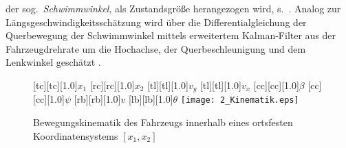 der sog.\ \emph{Schwimmwinkel}, als Zustandsgröße herangezogen wird, s.\ . Analog zur Längsgeschwindigkeitsschätzung wird über die Differentialgleichung der Querbewegung der Schwimmwinkel mittels erweitertem Kalman-Filter aus der Fahrzeugdrehrate um die Hochachse, der Querbeschleunigung und dem Lenkwinkel geschätzt \cite{tno2007_stateestimator, BHB2012_vanZanten_bremsanlage, Konig2008}.
\begin{figure}[h]
\centering
\newcommand{\smallsize}{.85}
	[tc][tc][1.0]{$x_1$}
	[rc][rc][1.0]{$x_2$}
	[tl][tl][1.0]{$v_y$}
	[tl][tl][1.0]{$v_x$}
	[cc][cc][1.0]{$\beta$}
	[cc][cc][1.0]{$\psi$}
	[rb][rb][1.0]{$v$}
	[lb][lb][1.0]{$\theta$}
\texttt{[image: 2\_Kinematik.eps]}
 \caption[Bewegungskinematik des Fahrzeugs]{Bewegungskinematik des Fahrzeugs innerhalb eines ortsfesten Koordinatensystems $[x_1, x_2]$}
 \label{fig:fahrzeugbewegung}
\end{figure} 



